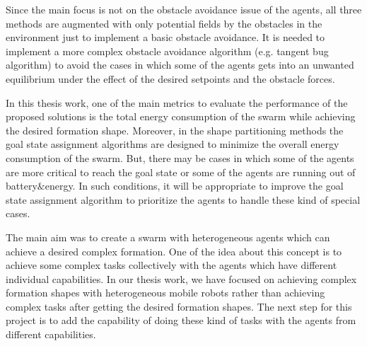 Since the main focus is not on the obstacle avoidance issue of the agents, all three methods are augmented with only potential fields by the obstacles in the environment just to implement a basic obstacle avoidance. It is needed to implement a more complex obstacle avoidance algorithm (e.g. tangent bug algorithm) to avoid the cases in which some of the agents gets into an unwanted equilibrium under the effect of the desired setpoints and the obstacle forces.
    
In this thesis work, one of the main metrics to evaluate the performance of the proposed solutions is the total energy consumption of the swarm while achieving the desired formation shape. Moreover, in the shape partitioning methods the goal state assignment algorithms are designed to minimize the overall energy consumption of the swarm. But, there may be cases in which some of the agents are more critical to reach the goal state or some of the agents are running out of battery$\&$energy. In such conditions, it will be appropriate to improve the goal state assignment algorithm to prioritize the agents to handle these kind of special cases. 
    
The main aim was to create a swarm with heterogeneous agents which can achieve a desired complex formation. One of the idea about this concept is to achieve some complex tasks collectively with the agents which have different individual capabilities. In our thesis work, we have focused on achieving complex formation shapes with heterogeneous mobile robots rather than achieving complex tasks after getting the desired formation shapes. The next step for this project is to add the capability of doing these kind of tasks with the agents from different capabilities.
		
		
		
		
		
		
		
		
		
		
		
		
		
		
		
		
		